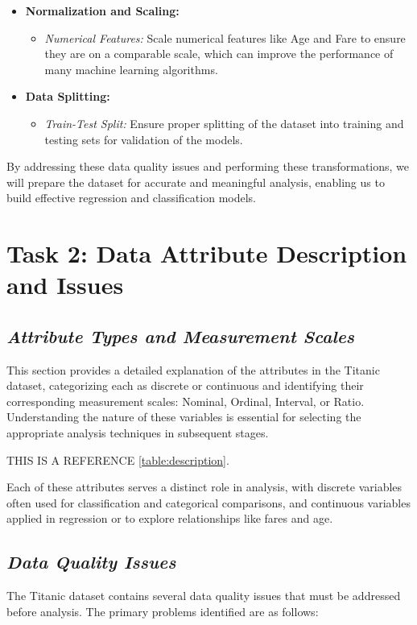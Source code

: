 \documentclass[twoside,11pt]{article}
\makeatletter
\let\@oldsection\section
\renewcommand\section[1]{\@oldsection*{#1}}
\let\@oldsubsection\subsection
\renewcommand\subsection[1]{\@oldsubsection*{\textit{#1}}}
\makeatother
\begin{document}
\begin{itemize}
\begin{itemize}
    \end{itemize}
    \item \textbf{Normalization and Scaling:}
    \begin{itemize}
        \item \textit{Numerical Features:} Scale numerical features like Age and Fare to ensure they are on a comparable scale, which can improve the performance of many machine learning algorithms.
    \end{itemize}
    \item \textbf{Data Splitting:}
    \begin{itemize}
        \item \textit{Train-Test Split:} Ensure proper splitting of the dataset into training and testing sets for validation of the models.
    \end{itemize}
\end{itemize}

By addressing these data quality issues and performing these transformations, we will prepare the dataset for accurate and meaningful analysis, enabling us to build effective regression and classification models.


\section{Task 2: Data Attribute Description and Issues}

\subsection{Attribute Types and Measurement Scales}
This section provides a detailed explanation of the attributes in the Titanic dataset, categorizing each as discrete or continuous and identifying their corresponding measurement scales: Nominal, Ordinal, Interval, or Ratio. Understanding the nature of these variables is essential for selecting the appropriate analysis techniques in subsequent stages.

THIS IS A REFERENCE \ref{table:description}.

Each of these attributes serves a distinct role in analysis, with discrete variables often used for classification and categorical comparisons, and continuous variables applied in regression or to explore relationships like fares and age.

\subsection{Data Quality Issues}
The Titanic dataset contains several data quality issues that must be addressed before analysis. The primary problems identified are as follows:
\end{document}
